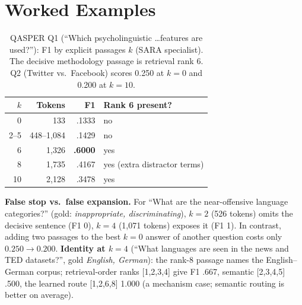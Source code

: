 \documentclass[10pt,twocolumn,letterpaper]{article}
\newcommand{\qasper}{\textsc{QASPER}\xspace}
\begin{document}
\section{Worked Examples}\label{app:examples}
\begin{table}[H]\centering\small\setlength{\tabcolsep}{5pt}
\caption{\qasper Q1 (``Which psycholinguistic \ldots features are used?''): F1 by explicit passages $k$ (SARA specialist). The decisive methodology passage is retrieval rank 6. Q2 (Twitter vs.\ Facebook) scores 0.250 at $k{=}0$ and 0.200 at $k{=}10$.}\label{tab:ex1}
\begin{tabular}{rrrl}\toprule
$k$ & Tokens & F1 & Rank 6 present?\\\midrule
0 & 133 & .1333 & no\\
2--5 & 448--1,084 & .1429 & no\\
6 & 1,326 & \textbf{.6000} & yes\\
8 & 1,735 & .4167 & yes (extra distractor terms)\\
10 & 2,128 & .3478 & yes\\\bottomrule
\end{tabular}\end{table}
\textbf{False stop vs.\ false expansion.} For ``What are the near-offensive language categories?'' (gold: \emph{inappropriate, discriminating}), $k{=}2$ (526 tokens) omits the decisive sentence (F1 0), $k{=}4$ (1,071 tokens) exposes it (F1 1). In contrast, adding two passages to the best $k{=}0$ answer of another question costs only $0.250\to0.200$. \textbf{Identity at $k{=}4$} (``What languages are seen in the news and TED datasets?'', gold \emph{English, German}): the rank-8 passage names the English--German corpus; retrieval-order ranks [1,2,3,4] give F1 .667, semantic [2,3,4,5] .500, the learned route [1,2,6,8] 1.000 (a mechanism case; semantic routing is better on average).
\end{document}
